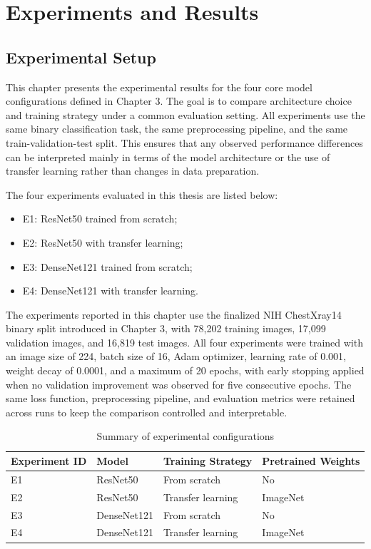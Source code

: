 \chapter{Experiments and Results}

\section{Experimental Setup}
This chapter presents the experimental results for the four core model configurations defined in Chapter 3. The goal is to compare architecture choice and training strategy under a common evaluation setting. All experiments use the same binary classification task, the same preprocessing pipeline, and the same train-validation-test split. This ensures that any observed performance differences can be interpreted mainly in terms of the model architecture or the use of transfer learning rather than changes in data preparation.

The four experiments evaluated in this thesis are listed below:
\begin{itemize}
    \item E1: ResNet50 trained from scratch;
    \item E2: ResNet50 with transfer learning;
    \item E3: DenseNet121 trained from scratch;
    \item E4: DenseNet121 with transfer learning.
\end{itemize}

The experiments reported in this chapter use the finalized NIH ChestXray14 binary split introduced in Chapter 3, with 78,202 training images, 17,099 validation images, and 16,819 test images. All four experiments were trained with an image size of 224, batch size of 16, Adam optimizer, learning rate of 0.001, weight decay of 0.0001, and a maximum of 20 epochs, with early stopping applied when no validation improvement was observed for five consecutive epochs. The same loss function, preprocessing pipeline, and evaluation metrics were retained across runs to keep the comparison controlled and interpretable.

\begin{table}[htbp]
    \centering
    \caption{Summary of experimental configurations}
    \label{tab:experiment-setup}
    \begin{tabular}{llll}
        \toprule
        Experiment ID & Model & Training Strategy & Pretrained Weights \\
        \midrule
        E1 & ResNet50 & From scratch & No \\
        E2 & ResNet50 & Transfer learning & ImageNet \\
        E3 & DenseNet121 & From scratch & No \\
        E4 & DenseNet121 & Transfer learning & ImageNet \\
        \bottomrule
    \end{tabular}
\end{table}

